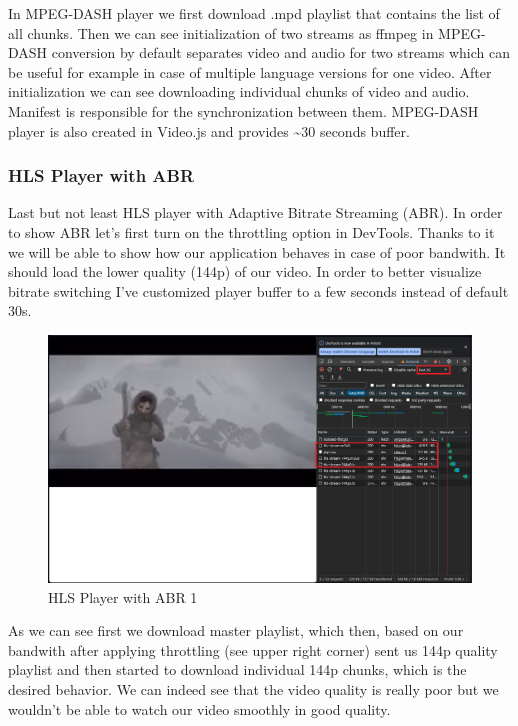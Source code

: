 \documentclass{article}
\begin{document}
In MPEG-DASH player we first download .mpd playlist that contains the
list of all chunks. Then we can see initialization of two streams as
ffmpeg in MPEG-DASH conversion by default separates video and audio for
two streams which can be useful for example in case of multiple language
versions for one video. After initialization we can see downloading
individual chunks of video and audio. Manifest is responsible for the
synchronization between them. MPEG-DASH player is also created in
Video.js and provides \textasciitilde30 seconds buffer.

\subsubsection{HLS Player with ABR}\label{hls-player-with-abr}

Last but not least HLS player with Adaptive Bitrate Streaming (ABR). In
order to show ABR let's first turn on the throttling option in DevTools.
Thanks to it we will be able to show how our application behaves in case
of poor bandwith. It should load the lower quality (144p) of our video.
In order to better visualize bitrate switching I've customized player
buffer to a few seconds instead of default 30s.

\begin{figure}[H]
\centering
\includegraphics[width=\textwidth]{images/5_hls_player_with_abr_1.png}
\caption{HLS Player with ABR 1}
\end{figure}

As we can see first we download master playlist, which then, based on
our bandwith after applying throttling (see upper right corner) sent us
144p quality playlist and then started to download individual 144p
chunks, which is the desired behavior. We can indeed see that the video
quality is really poor but we wouldn't be able to watch our video
smoothly in good quality.
\end{document}
